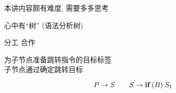 
\begin{frame}{}
  \begin{center}
    \begin{center}
      本讲内容颇有难度, 需要多多思考
    \end{center}
  \end{center}
\end{frame}

\begin{frame}
  \begin{center}
    心中有``树'' (语法分析树)
  \end{center}
\end{frame}

\begin{frame}{}
  \begin{center}
    {\Large 分工 \qquad 合作}

    \vspace{0.20cm}
  \end{center}

  \begin{center}
    为子节点准备跳转指令的目标标签 \\[5pt]
    子节点通过确定跳转目标
  \end{center}

  \vspace{-0.30cm}
  \[
    P \to S \qquad S \to \texttt{\bf if}\; (B)\; S_{1}
  \]
\end{frame}

\begin{frame}{}
\end{frame}
